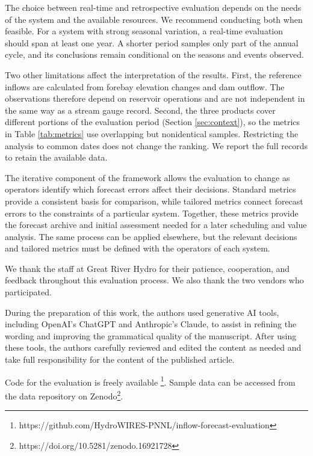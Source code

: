 \documentclass[MLA]{USG} %
\begin{document}
The choice between real-time and retrospective evaluation depends on the needs of the system and the available resources. We recommend conducting both when feasible. For a system with strong seasonal variation, a real-time evaluation should span at least one year. A shorter period samples only part of the annual cycle, and its conclusions remain conditional on the seasons and events observed.

Two other limitations affect the interpretation of the results. First, the reference inflows are calculated from forebay elevation changes and dam outflow. The observations therefore depend on reservoir operations and are not independent in the same way as a stream gauge record. Second, the three products cover different portions of the evaluation period (Section \ref{sec:context}), so the metrics in Table \ref{tab:metrics} use overlapping but nonidentical samples. Restricting the analysis to common dates does not change the ranking. We report the full records to retain the available data.

The iterative component of the framework allows the evaluation to change as operators identify which forecast errors affect their decisions. Standard metrics provide a consistent basis for comparison, while tailored metrics connect forecast errors to the constraints of a particular system. Together, these metrics provide the forecast archive and initial assessment needed for a later scheduling and value analysis. The same process can be applied elsewhere, but the relevant decisions and tailored metrics must be defined with the operators of each system.

We thank the staff at Great River Hydro for their patience, cooperation, and feedback throughout this evaluation process. We also thank the two vendors who participated. 

During the preparation of this work, the authors used generative AI tools,
including OpenAI’s ChatGPT and Anthropic's Claude, to assist in refining the
wording and improving the grammatical quality of the manuscript. After
using these tools, the authors carefully reviewed and edited the content as
needed and take full responsibility for the content of the published article.


Code for the evaluation is freely available
\footnote{https://github.com/HydroWIRES-PNNL/inflow-forecast-evaluation}. Sample data can be accessed from the data repository on Zenodo\footnote{https://doi.org/10.5281/zenodo.16921728}. 
\end{document}
